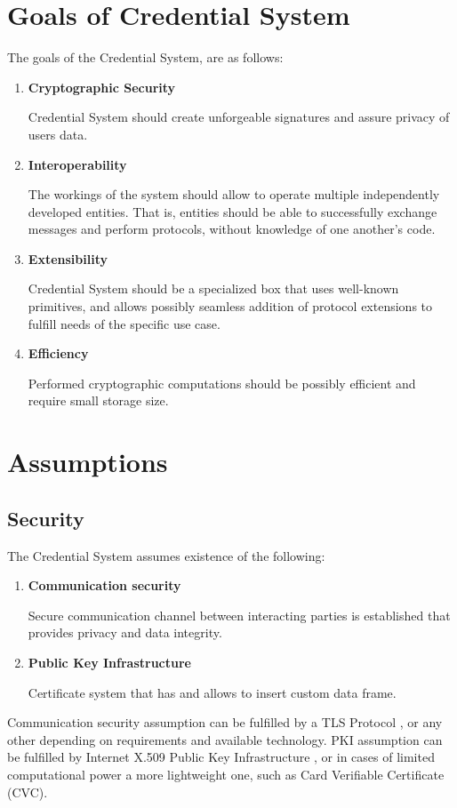 \section{Goals of Credential System}
The goals of the Credential System, are as follows:
\begin{enumerate}
    \item \textbf{Cryptographic Security}
    
    Credential System should create unforgeable signatures and assure privacy of users data.
    
    \item \textbf{Interoperability}
    
    The workings of the system should allow to operate multiple independently developed entities. That is, entities should be able to successfully exchange messages and perform protocols, without knowledge of one another's code.
    
    \item \textbf{Extensibility}
    
    Credential System should be a specialized box that uses well-known primitives, and allows possibly seamless addition of protocol extensions to fulfill needs of the specific use case.
    
    \item \textbf{Efficiency}
    
    Performed cryptographic computations should be possibly efficient and require small storage size. 
\end{enumerate}



\section{Assumptions}

\subsection{Security}
The Credential System assumes existence of the following:
\begin{enumerate} %
    \item \textbf{Communication security}
    
    Secure communication channel between interacting parties is established that provides privacy and data integrity.
    \item \textbf{Public Key Infrastructure}
    
    Certificate system that has and allows to insert custom data frame.  
\end{enumerate}
Communication security assumption can be fulfilled by a TLS Protocol \cite{rfc-tls}, or any other depending on requirements and available technology. PKI assumption can be fulfilled by Internet X.509 Public Key Infrastructure \cite{rfc5280}, or in cases of limited computational power a more lightweight one, such as Card Verifiable Certificate \cite{ISO-CVC} (CVC).


